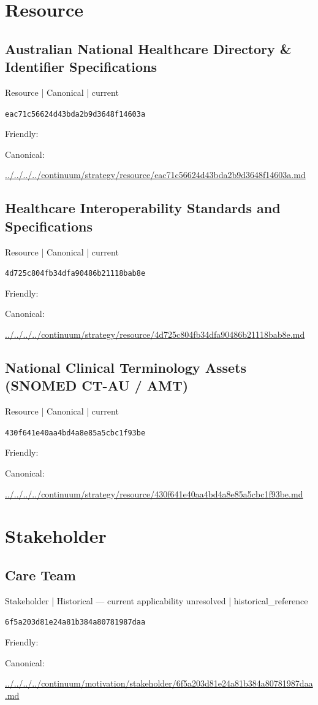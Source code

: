 \documentclass[10pt,a4paper]{article}
\begin{document}
\section*{Resource}
\subsection*{Australian National Healthcare Directory \& Identifier Specifications}
{\small Resource | Canonical | current}\par
\texttt{eac71c56624d43bda2b9d3648f14603a}\par
Friendly: \par
Canonical: \par
{\footnotesize\url{../../../../continuum/strategy/resource/eac71c56624d43bda2b9d3648f14603a.md}}\par
\subsection*{Healthcare Interoperability Standards and Specifications}
{\small Resource | Canonical | current}\par
\texttt{4d725c804fb34dfa90486b21118bab8e}\par
Friendly: \par
Canonical: \par
{\footnotesize\url{../../../../continuum/strategy/resource/4d725c804fb34dfa90486b21118bab8e.md}}\par
\subsection*{National Clinical Terminology Assets (SNOMED CT-AU / AMT)}
{\small Resource | Canonical | current}\par
\texttt{430f641e40aa4bd4a8e85a5cbc1f93be}\par
Friendly: \par
Canonical: \par
{\footnotesize\url{../../../../continuum/strategy/resource/430f641e40aa4bd4a8e85a5cbc1f93be.md}}\par
\section*{Stakeholder}
\subsection*{Care Team}
{\small Stakeholder | Historical — current applicability unresolved | historical\_reference}\par
\texttt{6f5a203d81e24a81b384a80781987daa}\par
Friendly: \par
Canonical: \par
{\footnotesize\url{../../../../continuum/motivation/stakeholder/6f5a203d81e24a81b384a80781987daa.md}}\par
\end{document}
